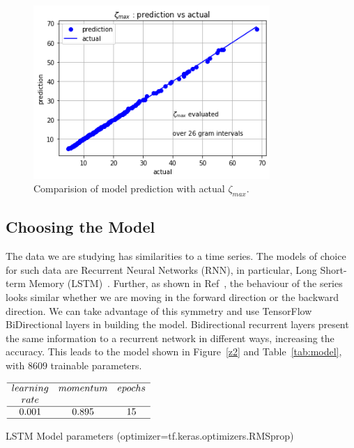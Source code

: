 \documentclass[twoside]{article}
\begin{document}
\begin{figure}
\centering
\includegraphics[width=0.8\textwidth]{4.png}
\caption[]{ 
  Comparision of model prediction with actual $\zeta_{max}$. 
  }
\vspace{1mm}
\label{z4}
\end{figure}


\subsection{\label{sec3.1} Choosing the Model}
The data we are studying has similarities to a time series. The models of choice for
such data are Recurrent Neural Networks (RNN), in particular,  
Long Short-term Memory (LSTM)~\cite{lstm}. Further, as shown in Ref~\cite{Shanker 2018a},
the behaviour of the series looks similar whether we are moving in the forward direction 
or the backward direction. We can take advantage of this symmetry and use TensorFlow
BiDirectional layers in building the model.  
Bidirectional recurrent layers present the same information to a recurrent network in different ways, 
increasing the accuracy.
This leads to the model shown in Figure~\ref{z2} and Table~\ref{tab:model}, 
with $8609$ trainable parameters.


\begin{table}
\centering \(\begin{array}{cccccccccccc}

\hline
learning     &momentum  &epochs  \\
rate    &  &  \\
\hline
0.001 &0.895  & 15  \\
\hline
\end{array}\)
\caption{LSTM Model parameters (optimizer=tf.keras.optimizers.RMSprop)}
\label{tab:mean12}
\end{table}
\end{document}
